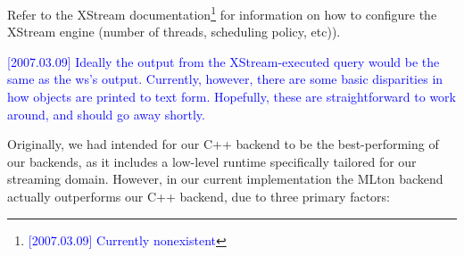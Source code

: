 \documentclass[twocolumn]{report}
\newcommand{\rednote}[1]{{\textcolor{blue}{#1}}}
\begin{document}
Refer to the XStream documentation\footnote{\rednote{[2007.03.09] Currently nonexistent}} 
for information on how to configure the XStream engine
(number of threads, scheduling policy, etc)).

\rednote{[2007.03.09] Ideally the output from the XStream-executed
query would be the same as the ws's output.  Currently, however, there are
some basic disparities in how objects are printed to text form.  Hopefully, these
are straightforward to work around, and should go away shortly.}

Originally, we had intended for our C++ backend to be the
best-performing of our backends, as it includes a low-level
runtime specifically tailored for our streaming domain.
However, in our current implementation the MLton backend actually
outperforms our C++ backend, due to three primary factors:  
%
\vspace{-1.5mm}
\end{document}
